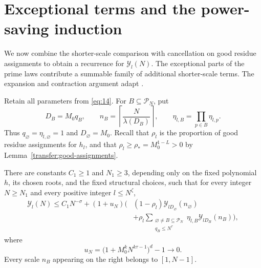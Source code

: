 \section{Exceptional terms and the power-saving induction}
\label{sec:induction}

We now combine the shorter-scale comparison with cancellation on good
residue assignments to obtain a recurrence for $\mathcal Y_l(N)$.
The exceptional parts of the prime laws contribute a summable family of
additional shorter-scale terms.  The expansion and contraction argument
adapt \cite[Proposition~9.2 and Theorem~9.3]{squarepower}.

Retain all parameters from \eqref{eq:14}.  For $B\subseteq\mathcal P_N$, put
\[
 D_B=M_0q_B,\qquad
 n_B=\left\lceil\frac{N}{\lambda(D_B)}\right\rceil,
 \qquad
 \eta_{l,B}=\prod_{p\in B}\eta_{l,p}.
\]
Thus $q_\varnothing=\eta_{l,\varnothing}=1$ and
$D_\varnothing=M_0$.  Recall that $\rho_l$ is the proportion of good
residue assignments for $h_l$, and that
$\rho_l\ge\rho_*=M_0^{1-L}>0$ by
Lemma~\ref{transfer:good-assignments}.

\begin{proposition}
\label{induction:recurrence}
There are constants $C_1\ge1$ and $N_1\ge3$, depending only on the fixed
polynomial $h$, its chosen roots, and the fixed structural choices, such that
for every integer $N\ge N_1$ and every positive integer $l\le N^\zeta$,
\begin{equation}
 \begin{split}
 \mathcal Y_l(N)\le C_1N^{-\sigma}
 +(1+u_N)\Bigg(&
   (1-\rho_l)\mathcal Y_{lD_\varnothing}(n_\varnothing)\\
 &+\rho_l
   \sum_{\substack{\varnothing\ne B\subseteq\mathcal P_N\\q_B\le N^\tau}}
      \eta_{l,B}\mathcal Y_{lD_B}(n_B)\Bigg),
 \end{split}
 \label{eq:31}
\end{equation}
where
\[
 u_N=\bigl(1+M_0^kN^{k\tau-1}\bigr)^d-1\longrightarrow0.
\]
Every scale $n_B$ appearing on the right belongs to $[1,N-1]$.
\end{proposition}

